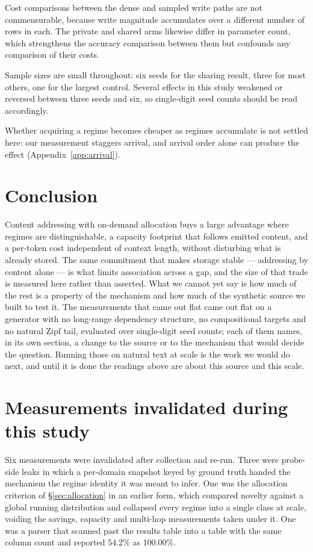 \documentclass[11pt,a4paper]{article}
\begin{document}
Cost comparisons between the dense and sampled write paths are not
commensurable, because write magnitude accumulates over a different number of
rows in each. The private and shared arms likewise differ in parameter count,
which strengthens the accuracy comparison between them but confounds any
comparison of their costs.

Sample sizes are small throughout: six seeds for the sharing result, three for
most others, one for the largest control. Several effects in this study
weakened or reversed between three seeds and six, so single-digit seed counts
should be read accordingly.

Whether acquiring a regime becomes cheaper as regimes accumulate is not settled
here: our measurement staggers arrival, and arrival order alone can produce the
effect (Appendix~\ref{app:arrival}).

\section{Conclusion}

Content addressing with on-demand allocation buys a large advantage where
regimes are distinguishable, a capacity footprint that follows emitted content,
and a per-token cost independent of context length, without disturbing what is
already stored. The same commitment that makes storage stable --- addressing by content alone
--- is what limits association across a gap, and the size of that trade is
measured here rather than asserted. What we cannot yet say is how much of the
rest is a property of the mechanism and how much of the synthetic source we
built to test it. The measurements that came out flat came out flat on a
generator with no long-range dependency structure, no compositional targets and
no natural Zipf tail, evaluated over single-digit seed counts; each of them
names, in its own section, a change to the source or to the mechanism that
would decide the question. Running those on natural text at scale is the work
we would do next, and until it is done the readings above are about this source
and this scale.

\appendix

\section{Measurements invalidated during this study}
\label{app:invalidated}

Six measurements were invalidated after collection and re-run. Three were
probe-side leaks in which a per-domain snapshot keyed by ground truth handed the
mechanism the regime identity it was meant to infer. One was the allocation
criterion of \S\ref{sec:allocation} in an earlier form, which compared novelty
against a global running distribution and collapsed every regime into a single
class at scale, voiding the savings, capacity and multi-hop measurements taken
under it. One was a parser that scanned past the results table into a table with
the same column count and reported $54.2\%$ as $100.00\%$.
\end{document}
